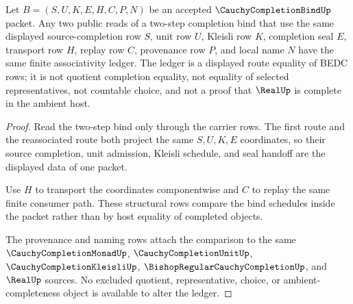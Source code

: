 \begin{theorem}
\label{thm:cauchy-completion-bind-associativity-ledger}
Let $B=(S,U,K,E,H,C,P,N)$ be an accepted $\CauchyCompletionBindUp$ packet. Any two public reads of a two-step completion bind that use the same displayed source-completion row $S$, unit row $U$, Kleisli row $K$, completion seal $E$, transport row $H$, replay row $C$, provenance row $P$, and local name $N$ have the same finite associativity ledger. The ledger is a displayed route equality of BEDC rows; it is not quotient completion equality, not equality of selected representatives, not countable choice, and not a proof that $\RealUp$ is complete in the ambient host.
\end{theorem}
\begin{proof}
Read the two-step bind only through the carrier rows. The first route and the reassociated route both project the same $S,U,K,E$ coordinates, so their source completion, unit admission, Kleisli schedule, and seal handoff are the displayed data of one packet.

Use $H$ to transport the coordinates componentwise and $C$ to replay the same finite consumer path. These structural rows compare the bind schedules inside the packet rather than by host equality of completed objects.

The provenance and naming rows attach the comparison to the same $\CauchyCompletionMonadUp$, $\CauchyCompletionUnitUp$, $\CauchyCompletionKleisliUp$, $\BishopRegularCauchyCompletionUp$, and $\RealUp$ sources. No excluded quotient, representative, choice, or ambient-completeness object is available to alter the ledger.
\end{proof}

